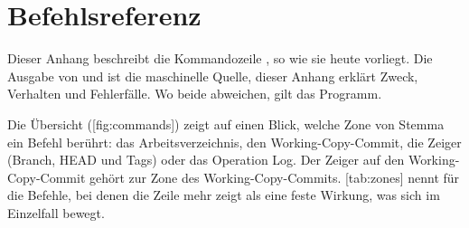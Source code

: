 \startappendices

\chapter[chap:cli]{Befehlsreferenz}

Dieser Anhang beschreibt die Kommandozeile , so wie sie heute vorliegt.
Die Ausgabe von  und
 ist die maschinelle Quelle, dieser Anhang erklärt Zweck,
Verhalten und Fehlerfälle. Wo beide abweichen, gilt das Programm.

Die Übersicht ([fig:commands]) zeigt auf einen Blick, welche Zone von Stemma
ein Befehl berührt: das Arbeitsverzeichnis, den Working-Copy-Commit,
die Zeiger (Branch, HEAD und Tags) oder das Operation Log.
Der Zeiger auf den Working-Copy-Commit gehört zur Zone des Working-Copy-Commits.
[tab:zones] nennt für die Befehle, bei denen die Zeile mehr zeigt als eine feste
Wirkung, was sich im Einzelfall bewegt.

